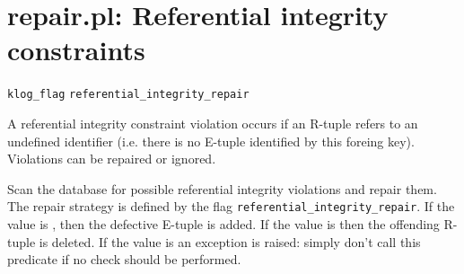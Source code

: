


\section{repair.pl: Referential integrity constraints}

\label{sec:repair}

\begin{tags}
\verb$klog_flag$ \verb$referential_integrity_repair$
\end{tags}

A referential integrity constraint violation occurs if an R-tuple
refers to an undefined identifier (i.e. there is no E-tuple identified
by this foreing key). Violations can be repaired or ignored.\vspace{0.7cm}

\begin{description}
Scan the database for possible referential integrity violations and
repair them. The repair strategy is defined by the flag
\verb$referential_integrity_repair$. If the value is , then the
defective E-tuple is added. If the value is  then the
offending R-tuple is deleted. If the value is  an exception
is raised: simply don't call this predicate if no check should be
performed.
\end{description}

